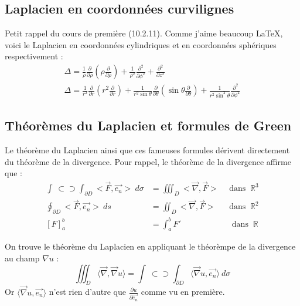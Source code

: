 \documentclass	[11pt, a4paper, openany]{book}
\newcommand{\oiint}{\int\!\!\!\!\!\!\! \:\!\subset\!\!\supset\!\!\!\!\!\!\!\int}
\begin{document}
	\subsection{Laplacien en coordonnées curvilignes}
	Petit rappel du cours de première (10.2.11). Comme j'aime beaucoup \LaTeX, voici le Laplacien
	en coordonnées cylindriques et en coordonnées sphériques respectivement :
	\begin{eqnarray}
	\Delta = \frac{1}{\rho}\frac{\partial}{\partial\rho}\left(\rho\frac{\partial}{\partial\rho}\right)
	+\frac{1}{\rho^2}\frac{\partial^2}{\partial\phi^2}+ \frac{\partial^2}{\partial z^2}\\
	\Delta = \frac{1}{r^2}\frac{\partial}{\partial r}\left(r^2\frac{\partial}{\partial r}\right) +
	\frac{1}{r^2\sin\theta}\frac{\partial}{\partial\theta}\left(\sin\theta\frac{\partial}{\partial
	\theta}\right) + \frac{1}{r^2\sin^2\theta}\frac{\partial^2}{\partial\phi^2}
	\end{eqnarray}
	
	\subsection{Théorèmes du Laplacien et formules de Green}
	Le théorème du Laplacien ainsi que ces fameuses formules dérivent directement du théorème de
	la divergence. Pour rappel, le théorème de la divergence affirme que :
	\begin{equation}
	\begin{array}{lll}
	\oiint_{\partial D} <\vec{F},\vec{e_n}>\ d\sigma &= \iiint_D <\vec{\nabla},\vec{F}>& \ \ \text{
	 dans }\ \mathbb{R}^3\\
	\oint_{\partial D}  <\vec{F},\vec{e_n}>\ ds &= \iint_D <\vec{\nabla},\vec{F}>& \ \ \text{
	 dans }\ \mathbb{R}^2\\
	\left[F\right]^b_a &= \int_a^b F' & \ \ \text{ dans }\ \mathbb{R}
	\end{array}
	\end{equation}
	
	On trouve le théorème du Laplacien en appliquant le théorèmpe de la divergence au champ 
	$\nabla u$ :
	\begin{equation}
	\iiint_D \langle\vec{\nabla},\vec{\nabla}u\rangle = \oiint_{\partial D} \langle\vec{\nabla}
	u, \vec{e_n}\rangle\ d\sigma
	\end{equation}
	Or $\langle\vec{\nabla}	u, \vec{e_n}\rangle$ n'est rien d'autre que $\frac{\partial u}{\partial
	\vec{e_n}}$ comme vu en première.\\
	 
\end{document}
